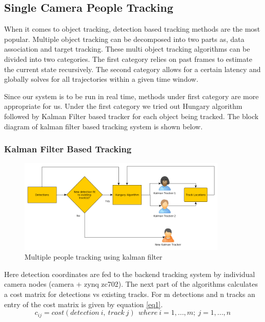 \documentclass[12pt,a4paper]{report}
\begin{document}
\subsection{Single Camera People Tracking}
When it comes to object tracking, detection based tracking methods are the most popular. Multiple object tracking can be decomposed into two parts as, data association and target tracking. These multi object tracking algorithms can be divided into two categories. The first category relies on past frames to estimate the current state recursively. The second category allows for a certain latency and globally solves for all trajectories within a given time window. 
\par Since our system is to be run in real time, methods under first category are more appropriate for us. Under the first category we tried out Hungary algorithm followed by Kalman Filter based tracker for each object being tracked.  The block diagram of kalman filter based tracking system is shown below.
\subsubsection{\large Kalman Filter Based Tracking}
\begin{figure}[H]
\includegraphics[width=10cm]{kalman_tracker.png}
\centering
\caption{Multiple people tracking using kalman filter}
\label{kalman}
\end{figure}
Here detection coordinates are fed to the backend tracking system by individual camera nodes (camera + zynq zc702). The next part of the algorithms calculates a cost matrix for detections vs existing tracks. For m detections and n tracks an entry of the cost matrix is given by equation \ref{eq1}.
\begin{equation}
\label{eq1}
c_{ij}= cost(detection\ i,\ track\ j)\ \  where\ i=1,...,m ;\ j=1,...,n
\end{equation}
\end{document}
